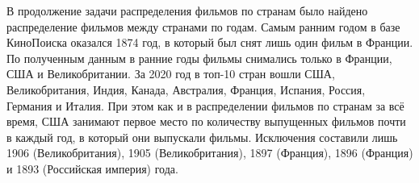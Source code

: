 В продолжение задачи распределения фильмов по странам было найдено распределение фильмов между странами по годам. Самым ранним годом в базе КиноПоиска оказался 1874 год, в который был снят лишь один фильм в Франции. По полученным данным в ранние годы фильмы снимались только в Франции, США и Великобритании. За 2020 год в топ-10 стран вошли США, Великобритания, Индия, Канада, Австралия, Франция, Испания, Россия, Германия и Италия. При этом как и в распределении фильмов по странам за всё время, США занимают первое место по количеству выпущенных фильмов почти в каждый год, в который они выпускали фильмы. Исключения составили лишь 1906 (Великобритания), 1905 (Великобритания), 1897 (Франция), 1896 (Франция) и 1893 (Российская империя) года.